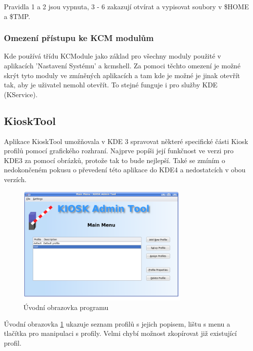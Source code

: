 Pravidla 1 a 2 jsou vypnuta, 3 - 6 zakazují otvírat a vypisovat soubory
v \$HOME a \$TMP.

\subsubsection{Omezení přístupu ke KCM modulům}
Kde používá třídu KCModule jako základ pro všechny moduly použité v aplikacích
'Nastavení Systému' a kcmshell. Za pomoci těchto omezení je možné skrýt
tyto moduly ve zmíněných aplikacích a tam kde je možné je jinak otevřít tak,
aby je uživatel nemohl otevřít. To stejné funguje i pro služby KDE (KService).

\subsection{KioskTool}
Aplikace KioskTool umožňovala v KDE 3 spravovat některé specifické části Kiosk
profilů pomocí grafického rozhraní. Najprve popíši její funkčnost ve verzi pro
KDE3 za pomocí obrázků, protože tak to bude nejlepší. Také se zmíním
o nedokončeném pokusu o převedení této aplikace do KDE4 a nedostatcích v obou
verzích.

\begin{figure}[h]
    \centering
    \includegraphics[width=8.5cm]{obrazky/KioskToolKDE3/uvodni_obrazovka.png}
    \caption{Úvodní obrazovka programu}
    \label{fig:kt3_uvodni}
\end{figure}
Úvodní obrazovka \ref{fig:kt3_uvodni} ukazuje seznam profilů s jejich popisem,
lištu s menu a tlačítka pro manipulaci s profily. Velmi chybí možnost zkopírovat
již existující profil.


